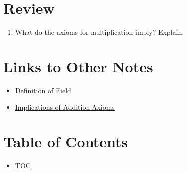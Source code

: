 \section*{Review}
\begin{enumerate}
  \item What do the axioms for multiplication imply? Explain.
\end{enumerate}


\section*{Links to Other Notes}
\begin{itemize}
  \item \hyperref[202501150657]{Definition of Field}
  \item \hyperref[202501150717]{Implications of Addition Axioms}
\end{itemize}

\section*{Table of Contents}

\begin{itemize}
  \item \hyperref[toc]{TOC}
\end{itemize}

